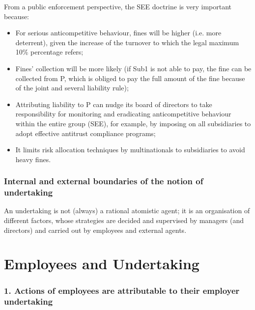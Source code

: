         From a public enforcement perspective, the SEE doctrine is very important because:
        \begin{itemize}
            \item For serious anticompetitive behaviour, fines will be higher (i.e. more deterrent), given the increase of the turnover to which the legal maximum 10\% percentage refers;
            \item Fines’ collection will be more likely (if Sub1 is not able to pay, the fine can be collected from P, which is obliged to pay the full amount of the fine because of the joint and several liability rule);
            \item Attributing liability to P can nudge its board of directors to take responsibility for monitoring and eradicating anticompetitive behaviour within the entire group (SEE), for example, by imposing on all subsidiaries to adopt effective antitrust compliance programs;
            \item It limits risk allocation techniques by multinationals to subsidiaries to avoid heavy fines.
        \end{itemize}

        \subsubsection{Internal and external boundaries of the notion of undertaking}

            An undertaking is not (always) a rational atomistic agent; it is an organisation of different factors, whose strategies are decided and supervised by managers (and directors) and carried out by employees and external agents.


\section{Employees and Undertaking}

        \subsubsection{1. Actions of employees are attributable to their employer undertaking}

            
